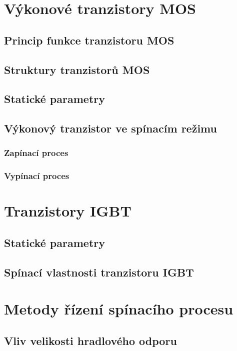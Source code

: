    \section{Výkonové tranzistory MOS}
     \subsection{Princip funkce tranzistoru MOS}
     \subsection{Struktury tranzistorů MOS}
     \subsection{Statické parametry}
     \subsection{Výkonový tranzistor ve spínacím režimu}
       \subsubsection{Zapínací proces}
       \subsubsection{Vypínací proces}

   \section{Tranzistory IGBT}
     \subsection{Statické parametry}
     \subsection{Spínací vlastnosti tranzistoru IGBT}

   \section{Metody řízení spínacího procesu}
     \subsection{Vliv velikosti hradlového odporu}
